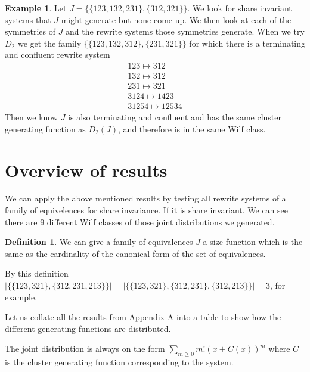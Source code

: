 \documentclass[a4paper, 11pt, english]{article}
\newcommand{\patternrule}{ \mapsto \!}
\theoremstyle{definition}
\newtheorem{definition}[theorem]{Definition}
\newtheorem{example}[theorem]{Example}
\begin{document}
\begin{example}
Let $J = \{\{123, 132, 231\}, \{312, 321\}\}$. We look for share invariant systems that $J$ might
generate but none come up. We then look at each of the symmetries of $J$ and the rewrite systems
those symmetries generate. When we try $D_2$ we get the family $\{ \{ 123, 132, 312 \}, \{ 231, 321
\} \}$ for which there is a terminating and confluent rewrite system
\[
    \begin{matrix}
        123 \patternrule 312 \\
        132 \patternrule 312 \\
        231 \patternrule 321 \\
        3124 \patternrule 1423 \\
        31254 \patternrule 12534
    \end{matrix}
\]
Then we know $J$ is also terminating and confluent and has the same cluster generating function as
$D_2(J)$, and therefore is in the same Wilf class.

\end{example}

\section{Overview of results}
We can apply the above mentioned results by testing all rewrite systems of a
family of equivelences for share invariance. If it is share invariant.
We can see there are 9 different Wilf classes of those joint distributions we
generated.

\begin{definition}
    We can give a family of equivalences $J$ a size function which is the same
    as the cardinality of the canonical form of the set of equivalences.

    By this definition $| \{ \{ 123, 321 \}, \{ 312, 231, 213 \} \}| = | \{ \{
    123, 321 \}, \{ 312, 231 \}, \{ 312, 213 \} \} | = 3$, for example.
\end{definition}

Let us collate all the results from Appendix A into a table to show how the
different generating functions are distributed.

The joint distribution is always on the form $\sum_{m \geq 0}m!(x+C(x))^m$ where $C$
is the cluster generating function corresponding to the system.
\end{document}
